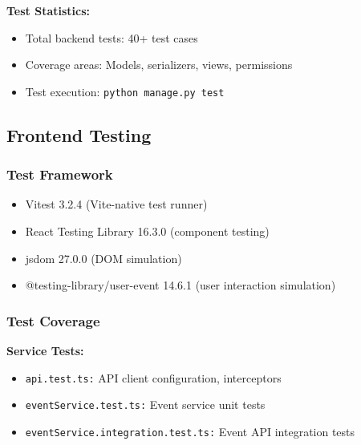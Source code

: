 \documentclass[11pt,a4paper]{article}
\begin{document}
\textbf{Test Statistics:}
\begin{itemize}[leftmargin=*]
    \item Total backend tests: 40+ test cases
    \item Coverage areas: Models, serializers, views, permissions
    \item Test execution: \texttt{python manage.py test}
\end{itemize}

\subsection{Frontend Testing}

\subsubsection{Test Framework}
\begin{itemize}[leftmargin=*]
    \item Vitest 3.2.4 (Vite-native test runner)
    \item React Testing Library 16.3.0 (component testing)
    \item jsdom 27.0.0 (DOM simulation)
    \item @testing-library/user-event 14.6.1 (user interaction simulation)
\end{itemize}

\subsubsection{Test Coverage}

\textbf{Service Tests:}
\begin{itemize}[leftmargin=*]
    \item \texttt{api.test.ts:} API client configuration, interceptors
    \item \texttt{eventService.test.ts:} Event service unit tests
    \item \texttt{eventService.integration.test.ts:} Event API integration tests
\end{itemize}
\end{document}

